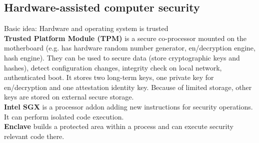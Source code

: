 \documentclass[12pt]{article}
\begin{document}
	\subsection{Hardware-assisted computer security}
	Basic idea: Hardware and operating system is trusted\\
	\textbf{Trusted Platform Module (TPM)} is a secure co-processor mounted on the motherboard (e.g. has hardware random number generator, en/decryption engine, hash engine). They can be used to secure data (store cryptographic keys and hashes), detect configuration changes, integrity check on local network, authenticated boot. It stores two long-term keys, one private key for en/decryption and one attestation identity key. Because of limited storage, other keys are stored on external secure storage.\\
	\textbf{Intel SGX} is a processor addon adding new instructions for security operations. It can perform isolated code execution.\\
	\textbf{Enclave} builds a protected area within a process and can execute security relevant code there.
	
	
\end{document}
